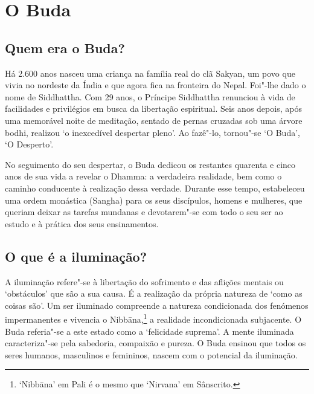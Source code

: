 
\setlength{\chapterTitleTopSkip}{10mm}


\chapter{O Buda}


\section{Quem era o Buda?}

Há 2.600 anos nasceu uma criança na família real do clã Sakyan, um povo
que vivia no nordeste da Índia e que agora fica na fronteira do Nepal.
Foi"-lhe dado o nome de Siddhattha. Com 29 anos, o Príncipe Siddhattha
renunciou à vida de facilidades e privilégios em busca da libertação
espiritual. Seis anos depois, após uma memorável noite de meditação,
sentado de pernas cruzadas sob uma árvore bodhi, realizou `o
inexcedível despertar pleno'. Ao fazê"-lo, tornou"-se `O Buda', `O
Desperto'.

No seguimento do seu despertar, o Buda dedicou os restantes quarenta e
cinco anos de sua vida a revelar o Dhamma: a verdadeira realidade, bem
como o caminho conducente à realização dessa verdade. Durante esse
tempo, estabeleceu uma ordem monástica (Sangha) para os seus discípulos,
homens e mulheres, que queriam deixar as tarefas mundanas e devotarem"-se
com todo o seu ser ao estudo e à prática dos seus ensinamentos.

\section{O que é a iluminação?}

A iluminação refere"-se à libertação do sofrimento e das aflições mentais
ou `obstáculos' que são a sua causa. É a realização da própria
natureza de `como as coisas são'. Um ser iluminado compreende a
natureza condicionada dos fenómenos impermanentes e vivencia o
Nibbāna,\footnote{%
  `Nibbāna' em Pali é o mesmo que `Nirvana' em Sânscrito.}
a realidade incondicionada subjacente. O Buda referia"-se a este estado
como a `felicidade suprema'. A mente iluminada caracteriza"-se pela
sabedoria, compaixão e pureza. O Buda ensinou que todos os seres
humanos, masculinos e femininos, nascem com o potencial da iluminação.

